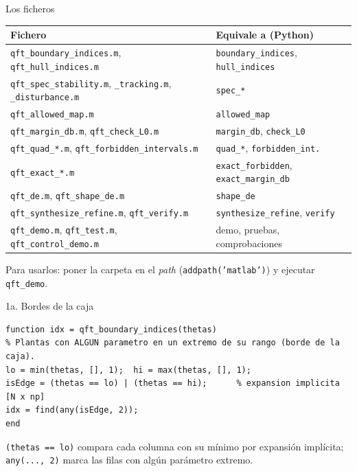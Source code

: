 \documentclass[aspectratio=169,11pt]{beamer}
\begin{document}
\begin{frame}{Los ficheros}
  \footnotesize
  \begin{center}
  \begin{tabular}{l|l}
    Fichero & Equivale a (Python)\\\hline
    \texttt{qft\_boundary\_indices.m}, \texttt{qft\_hull\_indices.m} & \texttt{boundary\_indices}, \texttt{hull\_indices}\\
    \texttt{qft\_spec\_stability.m}, \texttt{\_tracking.m}, \texttt{\_disturbance.m} & \texttt{spec\_*}\\
    \texttt{qft\_allowed\_map.m} & \texttt{allowed\_map}\\
    \texttt{qft\_margin\_db.m}, \texttt{qft\_check\_L0.m} & \texttt{margin\_db}, \texttt{check\_L0}\\
    \texttt{qft\_quad\_*.m}, \texttt{qft\_forbidden\_intervals.m} & \texttt{quad\_*}, \texttt{forbidden\_int.}\\
    \texttt{qft\_exact\_*.m} & \texttt{exact\_forbidden}, \texttt{exact\_margin\_db}\\
    \texttt{qft\_de.m}, \texttt{qft\_shape\_de.m} & \texttt{shape\_de}\\
    \texttt{qft\_synthesize\_refine.m}, \texttt{qft\_verify.m} & \texttt{synthesize\_refine}, \texttt{verify}\\
    \texttt{qft\_demo.m}, \texttt{qft\_test.m}, \texttt{qft\_control\_demo.m} & demo, pruebas, comprobaciones
  \end{tabular}
  \end{center}
  \footnotesize
  Para usarlos: poner la carpeta en el \emph{path} (\texttt{addpath('matlab')}) y ejecutar \texttt{qft\_demo}.
\end{frame}

\begin{frame}[fragile]{1a. Bordes de la caja}
\footnotesize
\begin{verbatim}
function idx = qft_boundary_indices(thetas)
% Plantas con ALGUN parametro en un extremo de su rango (borde de la caja).
lo = min(thetas, [], 1);  hi = max(thetas, [], 1);
isEdge = (thetas == lo) | (thetas == hi);      % expansion implicita [N x np]
idx = find(any(isEdge, 2));
end
\end{verbatim}
\footnotesize \texttt{(thetas == lo)} compara cada columna con su mínimo por expansión implícita; \texttt{any(..., 2)} marca las filas con algún parámetro extremo.
\end{frame}
\end{document}
